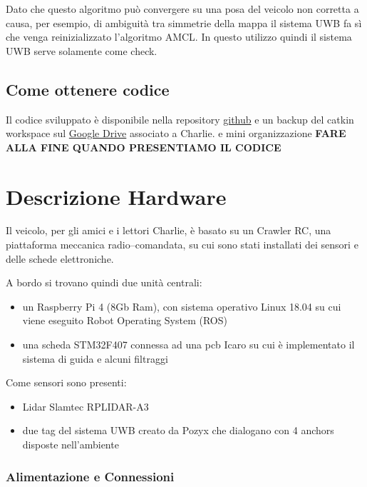 Dato che questo algoritmo pu\`o convergere su una posa del veicolo non corretta a causa, per esempio, di ambiguit\`a  tra simmetrie della mappa 
il sistema UWB fa s\`i che venga reinizializzato l'algoritmo AMCL. 
In questo utilizzo quindi il sistema UWB serve solamente come check.

\subsection*{Come ottenere codice}
Il codice sviluppato \`e disponibile nella repository \href{https://github.com/ABiondi12/project_sgn}{github} e un backup del catkin workspace sul 
\href{https://drive.google.com/drive/folders/1rXppVs0qSfeEKQumRFrPhkpiYDCvTXOL?usp=sharing}{Google Drive} associato a Charlie. 
e mini organizzazione \textbf{FARE ALLA FINE QUANDO PRESENTIAMO IL CODICE}


\newpage
\section{Descrizione Hardware}

Il veicolo, per gli amici e i lettori Charlie, \`e basato su un Crawler RC, una piattaforma meccanica radio--comandata,  su cui sono stati installati dei sensori e delle schede elettroniche. 

A bordo si trovano quindi due unit\`a centrali:
\begin{itemize}
	\item un Raspberry Pi 4 (8Gb Ram), con sistema operativo Linux 18.04 su cui viene eseguito Robot Operating System (ROS)
	\item una scheda STM32F407 connessa ad una pcb Icaro su cui è implementato il sistema di guida e alcuni filtraggi
\end{itemize}

Come sensori sono presenti:
\begin{itemize}
	\item Lidar Slamtec RPLIDAR-A3
	
	\item due tag del sistema UWB creato da Pozyx che dialogano con 4 anchors disposte nell'ambiente
\end{itemize}

\subsubsection*{Alimentazione e Connessioni}


